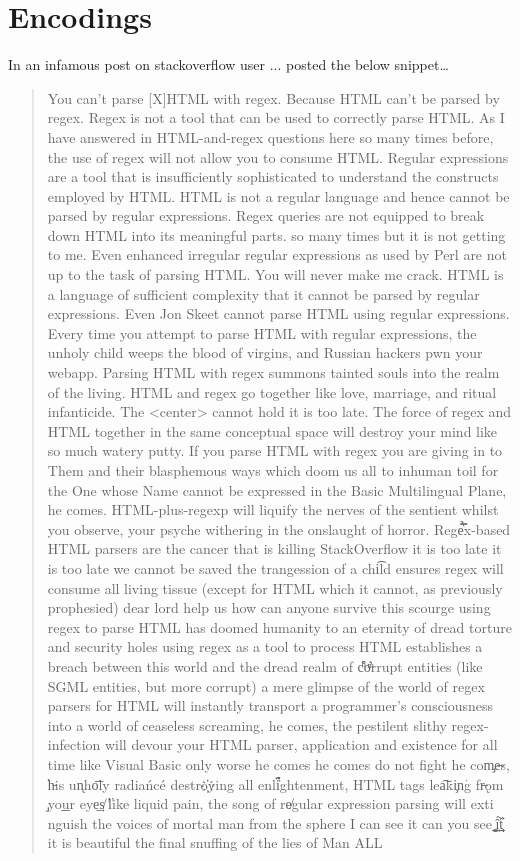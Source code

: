 \section{Encodings}

In an infamous post on stackoverflow user ... posted the below snippet\ldots

\begin{quotation}
You can't parse [X]HTML with regex. Because HTML can't be parsed by regex. Regex is not a tool that can be used to correctly parse HTML. As I have answered in HTML-and-regex questions here so many times before, the use of regex will not allow you to consume HTML. Regular expressions are a tool that is insufficiently sophisticated to understand the constructs employed by HTML. HTML is not a regular language and hence cannot be parsed by regular expressions. Regex queries are not equipped to break down HTML into its meaningful parts. so many times but it is not getting to me. Even enhanced irregular regular expressions as used by Perl are not up to the task of parsing HTML. You will never make me crack. HTML is a language of sufficient complexity that it cannot be parsed by regular expressions. Even Jon Skeet cannot parse HTML using regular expressions. Every time you attempt to parse HTML with regular expressions, the unholy child weeps the blood of virgins, and Russian hackers pwn your webapp. Parsing HTML with regex summons tainted souls into the realm of the living. HTML and regex go together like love, marriage, and ritual infanticide. The <center> cannot hold it is too late. The force of regex and HTML together in the same conceptual space will destroy your mind like so much watery putty. If you parse HTML with regex you are giving in to Them and their blasphemous ways which doom us all to inhuman toil for the One whose Name cannot be expressed in the Basic Multilingual Plane, he comes. HTML-plus-regexp will liquify the n​erves of the sentient whilst you observe, your psyche withering in the onslaught of horror. Rege̿̔̉x-based HTML parsers are the cancer that is killing StackOverflow it is too late it is too late we cannot be saved the trangession of a chi͡ld ensures regex will consume all living tissue (except for HTML which it cannot, as previously prophesied) dear lord help us how can anyone survive this scourge using regex to parse HTML has doomed humanity to an eternity of dread torture and security holes using regex as a tool to process HTML establishes a breach between this world and the dread realm of c͒ͪo͛ͫrrupt entities (like SGML entities, but more corrupt) a mere glimpse of the world of reg​ex parsers for HTML will ins​tantly transport a programmer's consciousness into a world of ceaseless screaming, he comes, the pestilent slithy regex-infection wil​l devour your HT​ML parser, application and existence for all time like Visual Basic only worse he comes he comes do not fi​ght he com̡e̶s, ̕h̵i​s un̨ho͞ly radiańcé destro҉ying all enli̍̈́̂̈́ghtenment, HTML tags lea͠ki̧n͘g fr̶ǫm ̡yo​͟ur eye͢s̸ ̛l̕ik͏e liq​uid pain, the song of re̸gular exp​ression parsing will exti​nguish the voices of mor​tal man from the sp​here I can see it can you see ̲͚̖͔̙î̩́t̲͎̩̱͔́̋̀ it is beautiful t​he final snuffing of the lie​s of Man ALL 
\end{quotation}
